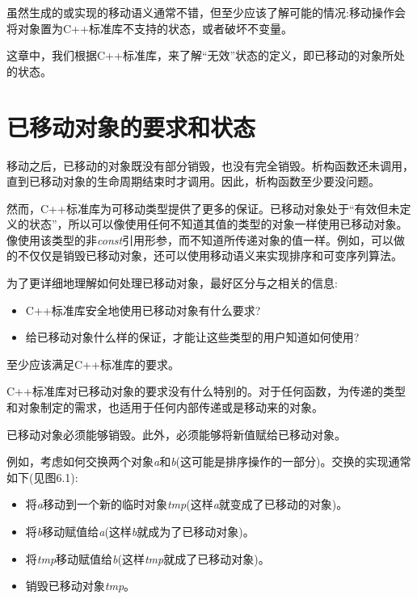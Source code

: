
虽然生成的或实现的移动语义通常不错，但至少应该了解可能的情况:移动操作会将对象置为C++标准库不支持的状态，或者破坏不变量。\par

这章中，我们根据C++标准库，来了解“无效”状态的定义，即已移动的对象所处的状态。\par


\section{已移动对象的要求和状态}

移动之后，已移动的对象既没有部分销毁，也没有完全销毁。析构函数还未调用，直到已移动对象的生命周期结束时才调用。因此，析构函数至少要没问题。\par

然而，C++标准库为可移动类型提供了更多的保证。已移动对象处于“有效但未定义的状态”，所以可以像使用任何不知道其值的类型的对象一样使用已移动对象。像使用该类型的非\textit{const}引用形参，而不知道所传递对象的值一样。例如，可以做的不仅仅是销毁已移动对象，还可以使用移动语义来实现排序和可变序列算法。\par

为了更详细地理解如何处理已移动对象，最好区分与之相关的信息:\par

\begin{itemize}
  \item C++标准库安全地使用已移动对象有什么要求?
  \item 给已移动对象什么样的保证，才能让这些类型的用户知道如何使用?
\end{itemize}

至少应该满足C++标准库的要求。\par


C++标准库对已移动对象的要求没有什么特别的。对于任何函数，为传递的类型和对象制定的需求，也适用于任何内部传递或是移动来的对象。\par

已移动对象必须能够销毁。此外，必须能够将新值赋给已移动对象。\par

例如，考虑如何交换两个对象\textit{a}和\textit{b}(这可能是排序操作的一部分)。交换的实现通常如下(见图6.1):\par

\begin{itemize}
  \item 将\textit{a}移动到一个新的临时对象\textit{tmp}(这样\textit{a}就变成了已移动的对象)。
  \item 将\textit{b}移动赋值给\textit{a}(这样\textit{b}就成为了已移动对象)。
  \item 将\textit{tmp}移动赋值给\textit{b}(这样\textit{tmp}就成了已移动对象)。
  \item 销毁已移动对象\textit{tmp}。
\end{itemize}

